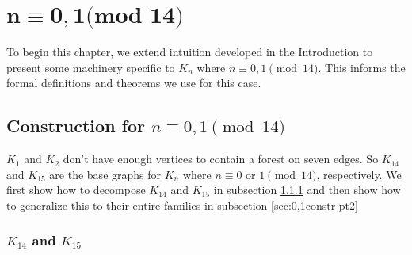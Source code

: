 \chapter{$\mathbf{n\equiv 0,1\textbf{(mod 14)}}$} \label{chap:0,1(mod 14)}

To begin this chapter, we extend intuition developed in the Introduction to present some machinery specific to $K_{n}$ where $n\equiv 0,1\pmod{14}$. This informs the formal definitions and theorems we use for this case.

\section{Construction for $n\equiv 0,1 \pmod{14}$}\label{sec:0,1constr}
$K_{1}$ and $K_{2}$ don't have enough vertices to contain a forest on seven edges. So $K_{14}$ and $K_{15}$ are the base graphs for $K_{n}$ where $n \equiv 0 \textrm{ or } 1 \pmod{14}$, respectively. We first show how to decompose $K_{14}$ and $K_{15}$ in subsection \ref{sec:0,1constr-pt1} and then show how to generalize this to their entire families in subsection \ref{sec:0,1constr-pt2}

\subsection{$K_{14}$ and $K_{15}$}\label{sec:0,1constr-pt1}



